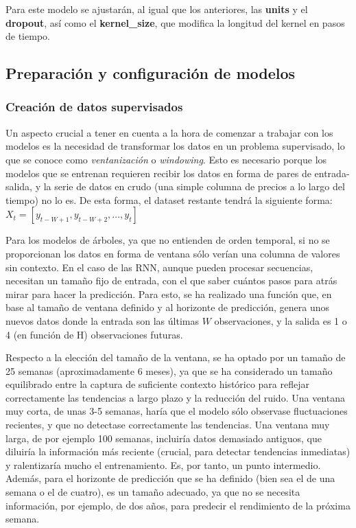 \documentclass[a4paper,onecolumn]{extarticle}
\begin{document}
\begin{sloppypar}
Para este modelo se ajustarán, al igual que los anteriores, las \textbf{units} y el \textbf{dropout}, así como el \textbf{kernel\_size}, que modifica la longitud del kernel en pasos de tiempo.

\subsection{Preparación y configuración de modelos} \label{preparacion}
\subsubsection{Creación de datos supervisados} \label{supervisados}
Un aspecto crucial a tener en cuenta a la hora de comenzar a trabajar con los modelos es la necesidad de transformar los datos en un problema supervisado, lo que se 
conoce como \textit{ventanización} o \textit{windowing}. Esto es necesario porque los modelos que se entrenan requieren recibir los datos en forma de pares de entrada-salida, y la serie
de datos en crudo (una simple columna de precios a lo largo del tiempo) no lo es. De esta forma, el dataset restante tendrá la siguiente forma: $X_t = \left[ y_{t-W+1}, y_{t-W+2}, \dots, y_t \right]$

Para los modelos de árboles, ya que no entienden de orden temporal, si no se proporcionan los datos en forma de ventana sólo verían una columna de valores sin contexto. En el 
caso de las RNN, aunque pueden procesar secuencias, necesitan un tamaño fijo de entrada, con el que saber cuántos pasos para atrás mirar para hacer la predicción. Para esto, se 
ha realizado una función que, en base al tamaño de ventana definido y al horizonte de predicción, genera unos nuevos datos donde la entrada son las últimas $W$ observaciones, y la salida 
es 1 o 4 (en función de H) observaciones futuras.

Respecto a la elección del tamaño de la ventana, se ha optado por un tamaño de 25 semanas (aproximadamente 6 meses), ya que se ha considerado un tamaño equilibrado entre la captura
de suficiente contexto histórico para reflejar correctamente las tendencias a largo plazo y la reducción del ruido. Una ventana muy corta, de unas 3-5 semanas, haría que el modelo 
sólo observase fluctuaciones recientes, y que no detectase correctamente las tendencias. Una ventana muy larga, de por ejemplo 100 semanas, incluiría datos demasiado antiguos, que 
diluiría la información más reciente (crucial, para detectar tendencias inmediatas) y ralentizaría mucho el entrenamiento. Es, por tanto, un punto intermedio. Además, para 
el horizonte de predicción que se ha definido (bien sea el de una semana o el de cuatro), es un tamaño adecuado, ya que no se necesita información, por ejemplo, de dos años, para
predecir el rendimiento de la próxima semana.


\end{sloppypar}
\end{document}

